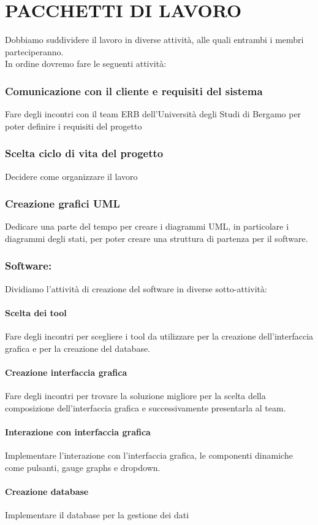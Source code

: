 \documentclass{report}
\begin{document}
\chapter{PACCHETTI DI LAVORO}
Dobbiamo suddividere il lavoro in diverse attività, alle quali entrambi i membri parteciperanno.\\
In ordine dovremo fare le seguenti attività:
\subsection*{Comunicazione con il cliente e requisiti del sistema}
Fare degli incontri con il team ERB dell'Università degli Studi di Bergamo per poter definire i requisiti del progetto
\subsection{Scelta ciclo di vita del progetto}
Decidere come organizzare il lavoro
\subsection*{Creazione grafici UML}
Dedicare una parte del tempo per creare i diagrammi UML, in particolare i diagrammi degli stati, per poter creare una struttura di partenza per il software.
\subsection*{Software:}
Dividiamo l'attività di creazione del software in diverse sotto-attività:
\subsubsection{Scelta dei tool}
Fare degli incontri per scegliere i tool da utilizzare per la creazione dell'interfaccia grafica e per la creazione del database.
\subsubsection{Creazione interfaccia grafica}
Fare degli incontri per trovare la soluzione migliore per la scelta della composizione dell'interfaccia grafica e successivamente presentarla al team.
\subsubsection{Interazione con interfaccia grafica}
Implementare l'interazione con l'interfaccia grafica, le componenti dinamiche come pulsanti, gauge graphs e dropdown.
\subsubsection{Creazione database}
Implementare il database per la gestione dei dati
\end{document}
